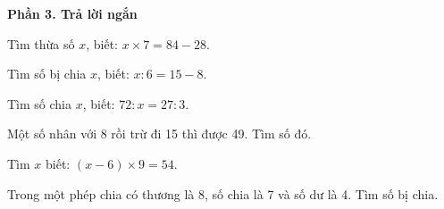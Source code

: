 \textbf{Phần 3. Trả lời ngắn}

\begin{ex} %
Tìm thừa số $x$, biết: $x \times 7 = 84 - 28$.
\end{ex}

\begin{ex} %
Tìm số bị chia $x$, biết: $x : 6 = 15 - 8$.
\end{ex}

\begin{ex} %
Tìm số chia $x$, biết: $72 : x = 27 : 3$.
\end{ex}

\begin{ex} %
Một số nhân với 8 rồi trừ đi 15 thì được 49. Tìm số đó.
\end{ex}

\begin{ex} %
Tìm $x$ biết: $(x - 6) \times 9 = 54$.
\end{ex}

\begin{ex} %
Trong một phép chia có thương là 8, số chia là 7 và số dư là 4. Tìm số bị chia.
\end{ex}
